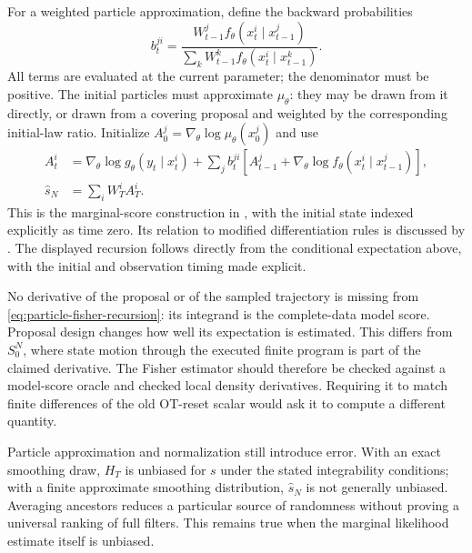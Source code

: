 \documentclass[11pt]{article}
\begin{document}
For a weighted particle approximation, define the backward probabilities
\begin{equation}
 b_t^{ji}=
 \frac{W_{t-1}^j f_\theta(x_t^i\mid x_{t-1}^j)}
      {\sum_kW_{t-1}^k f_\theta(x_t^i\mid x_{t-1}^k)}.
 \label{eq:backward-particle-probabilities}
\end{equation}
All terms are evaluated at the current parameter; the denominator must be
positive. The initial particles must approximate $\mu_\theta$: they may be
drawn from it directly, or drawn from a covering proposal and weighted by
the corresponding initial-law ratio. Initialize
$A_0^j=\nabla_\theta\log\mu_\theta(x_0^j)$ and use
\begin{align}
 A_t^i&=\nabla_\theta\log g_\theta(y_t\mid x_t^i)
       +\sum_j b_t^{ji}\left[A_{t-1}^j
          +\nabla_\theta\log f_\theta(x_t^i\mid x_{t-1}^j)\right],\\
 \widehat s_N&=\sum_i W_T^i A_T^i.
 \label{eq:particle-fisher-recursion}
\end{align}
This is the marginal-score construction in
\citet[Section 2.2, Algorithm 2, equations (20) and (22)]{poyiadjis2011particle},
with the initial state indexed explicitly as time zero. Its relation to
modified differentiation rules is discussed by
\citet[Section 4.2, equations (24)--(25)]{scibior2021dpf}. The displayed
recursion follows directly from the conditional expectation above, with the
initial and observation timing made explicit.

No derivative of the proposal or of the sampled trajectory is missing from
\eqref{eq:particle-fisher-recursion}: its integrand is the complete-data
model score. Proposal design changes how well its expectation is estimated.
This differs from $S_0^N$, where state motion through the executed finite
program is part of the claimed derivative. The Fisher estimator should
therefore be checked against a model-score oracle and checked local density
derivatives. Requiring it to match finite differences of the old OT-reset
scalar would ask it to compute a different quantity.

Particle approximation and normalization still introduce error. With an
exact smoothing draw, $H_T$ is unbiased for $s$ under the stated integrability
conditions; with a finite approximate smoothing distribution,
$\widehat s_N$ is not generally unbiased. Averaging ancestors reduces a
particular source of randomness without proving a universal ranking of full
filters. This remains true when the marginal likelihood estimate itself is
unbiased.
\end{document}
